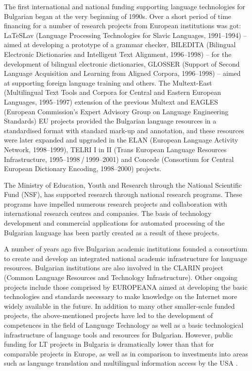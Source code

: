 \begin{multicols}{2}
  The first international and national funding supporting language technologies for Bulgarian began at the very beginning of 1990s. Over a short period of time financing for a number of research projects from European institutions was got: LaTeSLav (Language Processing Technologies for Slavic Languages, 1991--1994) -- aimed at developing a prototype of a grammar checker, BILEDITA (Bilingual Electronic Dictionaries and Intelligent Text Alignment, 1996--1998) -- for the development of bilingual electronic dictionaries, GLOSSER (Support of Second Language Acquisition and Learning from Aligned Corpora, 1996--1998) -- aimed at supporting foreign language training and others. The Multext-East (Multilingual Text Tools and Corpora for Central and Eastern European Languages, 1995--1997) extension of the previous Multext and EAGLES (European Commission's Expert Advisory Group on Language Engineering Standards) EU projects provided the Bulgarian language resources in a standardised format
    with standard mark-up and annotation, and these resources were later expanded and upgraded in the ELAN (European Language Activity Network, 1998--1999), TELRI I in II (Trans European Language Resources Infrastructure, 1995--1998\,/\,1999--2001) and Concede (Consortium for Central European Dictionary Encoding, 1998--2000) projects.

  The Ministry of Education, Youth and Research through the National Scientific Fund (NSF), has supported research through national research programs. These programs have impelled numerous research projects and collaboration with international research centres and companies. The basis of technology development and commercial applications for automated processing of the Bulgarian language has been partly created as a result of these projects.

  A number of years ago five Bulgarian academic institutions founded a consortium to create and develop an integrated national academic infrastructure for language resources. Bulgarian institutions are also involved in the CLARIN project (Common Language Resources and Technology Infrastructure). Other ongoing projects include those comprised by EUROPEANA aimed at developing the basic technologies and standards necessary to make knowledge on the Internet more widely available in the future. In addition to many other smaller-scale funded projects, the above-mentioned projects have led to the development of competences in the field of Language Technology as well as a basic technological infrastructure of language tools and resources for Bulgarian. However, public funding for LT projects in Bulgaria is dramatically lower than that for comparable projects in Europe, as well as in comparison to investments into areas such as language translation and multilingual information access by
    the USA \cite{sprachtech}.  


\end{multicols}
